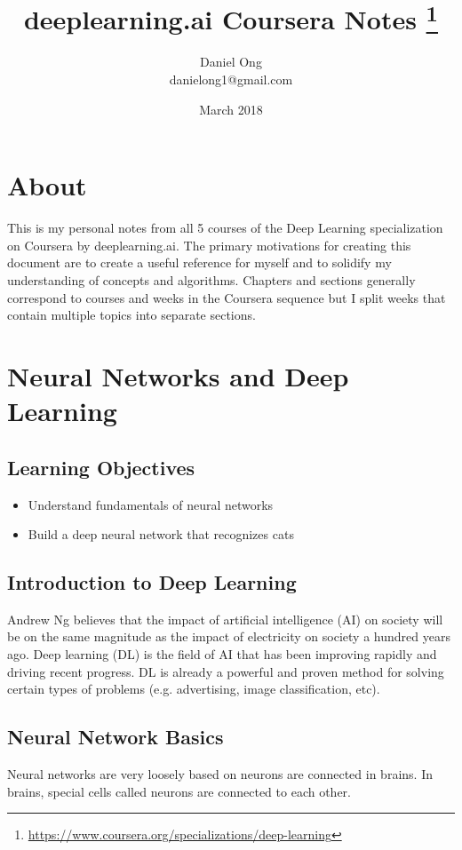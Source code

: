 \documentclass[11pt]{report}
\title{deeplearning.ai Coursera Notes \thanks{\url{https://www.coursera.org/specializations/deep-learning}}}
\author{Daniel Ong\\ danielong1@gmail.com}
\date{March 2018}
\begin{document}
\maketitle

\tableofcontents

\chapter*{About} 
This is my personal notes from all 5 courses of the Deep Learning specialization on Coursera by deeplearning.ai. The primary motivations for creating this document are to create a useful reference for myself and to solidify my understanding of concepts and algorithms. Chapters and sections generally correspond to courses and weeks in the Coursera sequence but I split weeks that contain multiple topics into separate sections.


\chapter{Neural Networks and Deep Learning}
\section*{Learning Objectives}
\begin{itemize}
  \item Understand fundamentals of neural networks
  \item Build a deep neural network that recognizes cats
\end{itemize}

\section{Introduction to Deep Learning}
Andrew Ng believes that the impact of artificial intelligence (AI) on society will be on the same magnitude as the impact of electricity on society a hundred years ago. Deep learning (DL) is the field of AI that has been improving rapidly and driving recent progress. DL is already a powerful and proven method for solving certain types of problems (e.g. advertising, image classification, etc). 


\section{Neural Network Basics}
Neural networks are very loosely based on neurons are connected in brains. In brains, special cells called neurons are connected to each other. 
\end{document}
